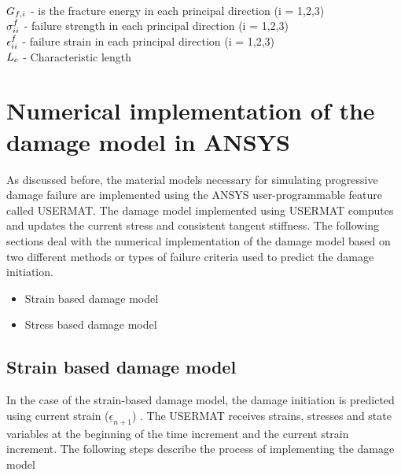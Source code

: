 \documentclass[12pt,a4paper,twoside,openright]{report}
\begin{document}
\\ 
\\ 
\\
$\mathlarger{G_{f,i}}$ \; - \;is the fracture energy in each principal direction (i = 1,2,3)  \\ $\mathlarger{\sigma_{ii}^{f}}$ \;\;\; -  \;  failure strength in each principal direction (i = 1,2,3) \\ $\mathlarger{\epsilon_{ii}^{f}}$\;\;\;\;\; - \; failure strain in each principal direction (i = 1,2,3) \\ $\mathlarger{L_{c}}$\;\;\;\;\; - \; Characteristic length

\section{Numerical implementation of the damage model in ANSYS}
\indent\indent\indent  As discussed before, the material models necessary for simulating progressive damage failure are implemented using the ANSYS user-programmable feature called USERMAT. The damage model implemented using USERMAT computes and updates the current stress and consistent tangent stiffness. The following sections deal with the numerical implementation of the damage model based on two different methods or types of failure criteria used to predict the damage initiation.
\\
\begin{itemize}
\item Strain based damage model 
\item Stress based damage model 
\end{itemize}
\subsection{Strain based damage model}
\indent\indent\indent  In the case of the strain-based damage model, the damage initiation is predicted using current strain ($\underline{\epsilon}_{n+1}$) \citep{wang2009three}.   The USERMAT receives strains, stresses and state variables at the beginning of the time increment and the current strain increment. The following steps describe the process of implementing the damage model
\end{document}
